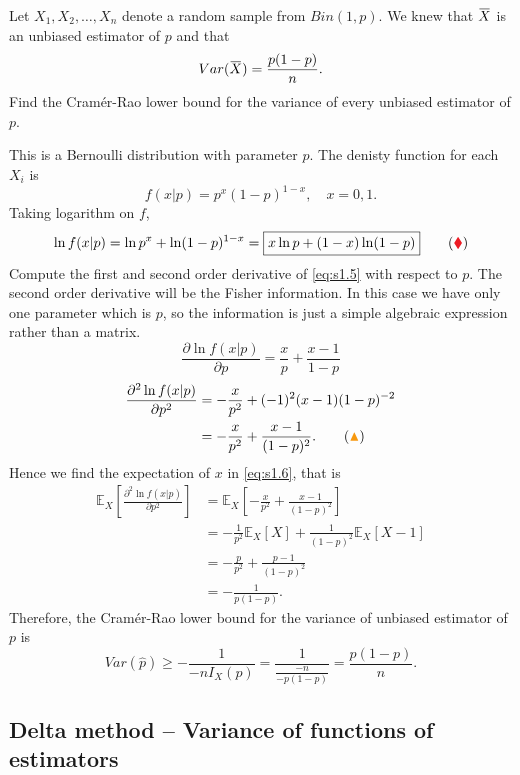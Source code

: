 \begin{example}
    Let $X_1, X_2, \ldots, X_n$ denote a random sample from $Bin(1, p)$. We knew that $\ols{X}$ is an 
    unbiased estimator of $p$ and that 
    \[
        Var(\ols{X}) = \frac{p(1-p)}{n}.
    \]
    Find the Cramér-Rao lower bound for the variance of every unbiased estimator of $p$.
\end{example}
\begin{solution}
    This is a Bernoulli distribution with parameter $p$. The denisty function for each $X_i$ is 
    \[
        f(x|p) = p^x (1-p)^{1-x}, \quad x = 0,1.
    \]
    Taking logarithm on $f$,
    \[
        \ln f(x|p) = \ln p^x + \ln (1-p)^{1-x} = \fbox{$x \ln p + (1-x) \ln (1-p)$} \label{eq:s1.5} \tag{{\color{Red} $\blacklozenge $}}
    \]
    Compute the first and second order derivative of \eqref{eq:s1.5} with respect to $p$. The second 
    order derivative will be the Fisher information. In this case we have only one parameter which is $p$, so the information 
    is just a simple algebraic expression rather than a matrix.
    \[
        \frac{\partial \ln f(x|p)}{\partial p} = \frac{x}{p} + \frac{x-1}{1-p}
    \]
    \begin{align*}
        \frac{\partial^2 \ln f(x|p)}{\partial p^2} &= -\frac{x}{p^2} + (-1)^2(x-1)(1-p)^{-2}\\
        &= -\frac{x}{p^2} + \frac{x-1}{(1-p)^2}. \label{eq:s1.6} \tag{{\color{YellowOrange} $\blacktriangle$}}
    \end{align*}
    Hence we find the expectation of $x$ in \eqref{eq:s1.6}, that is
    \begin{align*}
        \mathbb{E}_X \left[ \frac{\partial^2 \ln f(x|p)}{\partial p^2} \right] &= \mathbb{E}_X \left[ -\frac{x}{p^2} + \frac{x-1}{(1-p)^2} \right]\\
        &= - \frac{1}{p^2} \mathbb{E}_X[X] + \frac{1}{(1 - p)^2} \mathbb{E}_X[X - 1]\\
        &= - \frac{p}{p^2} + \frac{p-1}{(1 - p)^2}\\
        &= - \frac{1}{p(1-p)}.
    \end{align*}
    Therefore, the Cramér-Rao lower bound for the variance of unbiased estimator of $p$ is 
    \[
        Var(\widehat{p}) \geq - \frac{1}{-n I_X(p)} = \frac{1}{\displaystyle \frac{-n}{-p(1-p)}} = \frac{p(1-p)}{n}.
    \]
\end{solution}

\subsection{Delta method -- Variance of functions of estimators}

